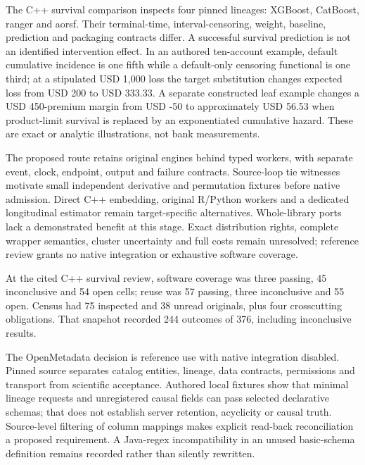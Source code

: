 The C++ survival comparison inspects four pinned lineages: XGBoost,
CatBoost, ranger and aorsf. Their terminal-time, interval-censoring,
weight, baseline, prediction and packaging contracts differ. A
successful survival prediction is not an identified intervention effect.
In an authored ten-account example, default cumulative incidence is one
fifth while a default-only censoring functional is one third; at a
stipulated USD 1,000 loss the target substitution changes expected loss
from USD 200 to USD 333.33. A separate constructed leaf example changes
a USD 450-premium margin from USD -50 to approximately USD 56.53 when
product-limit survival is replaced by an exponentiated cumulative
hazard. These are exact or analytic illustrations, not bank
measurements.
\citep{exec24_longcxx_xgboost,exec24_longcxx_catboost,exec24_longcxx_ranger,exec24_longcxx_aorsf,exec24_longcxx_reference}

The proposed route retains original engines behind typed workers, with
separate event, clock, endpoint, output and failure contracts.
Source-loop tie witnesses motivate small independent derivative and
permutation fixtures before native admission. Direct C++ embedding,
original R/Python workers and a dedicated longitudinal estimator remain
target-specific alternatives. Whole-library ports lack a demonstrated
benefit at this stage. Exact distribution rights, complete wrapper
semantics, cluster uncertainty and full costs remain unresolved;
reference review grants no native integration or exhaustive software
coverage.

At the cited C++ survival review, software coverage was three passing,
45 inconclusive and 54 open cells; reuse was 57 passing, three
inconclusive and 55 open. Census had 75 inspected and 38 unread
originals, plus four crosscutting obligations. That snapshot recorded
244 outcomes of 376, including inconclusive results.
\citep{sp24longcxx_reader,sp24longcxx_progress}

The OpenMetadata decision is reference use with native integration
disabled. Pinned source separates catalog entities, lineage, data
contracts, permissions and transport from scientific acceptance.
Authored local fixtures show that minimal lineage requests and
unregistered causal fields can pass selected declarative schemas; that
does not establish server retention, acyclicity or causal truth.
Source-level filtering of column mappings makes explicit read-back
reconciliation a proposed requirement. A Java-regex incompatibility in
an unused basic-schema definition remains recorded rather than silently
rewritten.
\citep{exec24_openmetadata_source,exec24_openmetadata_reference}

